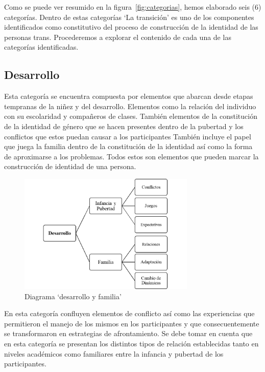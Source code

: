 Como se puede ver resumido en la figura~\ref{fig:categorias}, hemos elaborado
seis (6) categorías. Dentro de estas categorías ‘La transición’ es uno de los
componentes identificados como constitutivo del proceso de construcción de la
identidad de las personas trans. Procederemos a explorar el contenido de cada
una de las categorías identificadas.

\subsection{Desarrollo}

Esta categoría se encuentra compuesta por elementos que
abarcan desde etapas tempranas de la niñez y del desarrollo. Elementos como la
relación del individuo con su escolaridad y compañeros de clases. También
elementos de la constitución de la identidad de género que se hacen presentes
dentro de la pubertad y los conflictos que estos puedan causar a los
participantes También incluye el papel que juega la familia dentro de la
constitución de la identidad así como la forma de aproximarse a los problemas.
Todos estos son elementos que pueden marcar la construcción de identidad de una
persona.

\begin{figure}
    \centering
    \includegraphics[width=0.75\textwidth]{desarrollo}
    \caption{Diagrama ‘desarrollo y familia’}\label{fig:desarrollo}
\end{figure}

En esta categoría confluyen elementos de conflicto así como las experiencias que
permitieron el manejo de los mismos en los participantes y que
consecuentemente se transformaron en estrategias de afrontamiento. Se debe tomar
en cuenta que en esta categoría se presentan los distintos tipos de relación
establecidas tanto en niveles académicos como familiares entre la infancia y
pubertad de los participantes.

